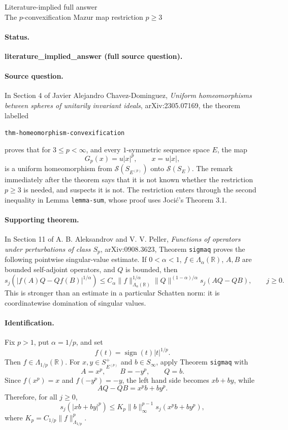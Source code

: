 \documentclass[11pt]{article}
\newcommand{\Sph}{\mathscr S}
\newcommand{\SE}{S_E}
\newcommand{\SEp}{S_{E^{(p)}}}
\newcommand{\Lip}{\Lambda}
\newcommand{\R}{\mathbb R}
\begin{document}
\begin{center}
{\Large Literature-implied full answer}\\[3pt]
{\large The \(p\)-convexification Mazur map restriction \(p\ge 3\)}
\end{center}

\paragraph{Status.}
\textbf{literature\_implied\_answer (full source question).}

\paragraph{Source question.}
In Section 4 of Javier Alejandro Chavez-Dominguez,
\emph{Uniform homeomorphisms between spheres of unitarily invariant ideals},
arXiv:2305.07169, the theorem labelled
\begin{center}
\texttt{thm-homeomorphism-convexification}
\end{center}
proves that for \(3\le p<\infty\), and every \(1\)-symmetric sequence space
\(E\), the map
\[
G_p(x)=u|x|^p,\qquad x=u|x|,
\]
is a uniform homeomorphism from \(\Sph(\SEp)\) onto \(\Sph(\SE)\).  The
remark immediately after the theorem says that it is not known whether the
restriction \(p\ge 3\) is needed, and suspects it is not.  The restriction
enters through the second inequality in Lemma \texttt{lemma-sum}, whose proof
uses Joci\'c's Theorem 3.1.

\paragraph{Supporting theorem.}
In Section 11 of A. B. Aleksandrov and V. V. Peller,
\emph{Functions of operators under perturbations of class \(S_p\)},
arXiv:0908.3623, Theorem \texttt{sigmaq} proves the following pointwise
singular-value estimate.  If \(0<\alpha<1\), \(f\in \Lip_\alpha(\R)\),
\(A,B\) are bounded self-adjoint operators, and \(Q\) is bounded, then
\[
s_j\!\left(\left|f(A)Q-Qf(B)\right|^{1/\alpha}\right)
\le C_\alpha \|f\|_{\Lip_\alpha(\R)}^{1/\alpha}
   \|Q\|^{(1-\alpha)/\alpha} s_j(AQ-QB),
\qquad j\ge0.
\]
This is stronger than an estimate in a particular Schatten norm: it is
coordinatewise domination of singular values.

\paragraph{Identification.}
Fix \(p>1\), put \(\alpha=1/p\), and set
\[
f(t)=\operatorname{sign}(t)|t|^{1/p}.
\]
Then \(f\in\Lip_{1/p}(\R)\).  For \(x,y\in \SEp^+\) and \(b\in S_\infty\),
apply Theorem \texttt{sigmaq} with
\[
A=x^p,\qquad B=-y^p,\qquad Q=b.
\]
Since \(f(x^p)=x\) and \(f(-y^p)=-y\), the left hand side becomes
\(xb+by\), while
\[
AQ-QB=x^p b+b y^p.
\]
Therefore, for all \(j\ge0\),
\[
s_j\!\left(|xb+by|^p\right)
\le K_p \|b\|_\infty^{p-1}s_j(x^pb+by^p),
\]
where \(K_p=C_{1/p}\|f\|_{\Lip_{1/p}}^p\).
\end{document}
